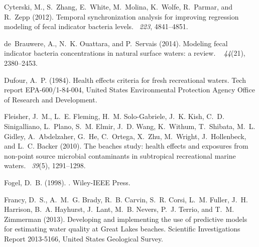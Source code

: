 \documentclass[authoryear,review, 12pt]{elsarticle}
\begin{document}
\begin{thebibliography}{}
Cyterski, M., S.~Zhang, E.~White, M.~Molina, K.~Wolfe, R.~Parmar, and R.~Zepp
  (2012).
\newblock Temporal synchronization analysis for improving regression modeling
  of fecal indicator bacteria levels.
~{\em 223}, 4841--4851.

de~Brauwere, A., N.~K. Ouattara, and P.~Servais (2014).
\newblock Modeling fecal indicator bacteria concentrations in natural surface
  waters: a review.
~{\em
  44\/}(21), 2380--2453.

Dufour, A.~P. (1984).
\newblock Health effects criteria for fresh recreational waters.
\newblock Tech report EPA-600/1-84-004, {United States Environmental Protection
  Agency Office of Research and Development}.

Fleisher, J.~M., L.~E. Fleming, H.~M. Solo-Gabriele, J.~K. Kish, C.~D.
  Sinigalliano, L.~Plano, S.~M. Elmir, J.~D. Wang, K.~Withum, T.~Shibata, M.~L.
  Gidley, A.~Abdelzaher, G.~He, C.~Ortega, X.~Zhu, M.~Wright, J.~Hollenbeck,
  and L.~C. Backer (2010).
\newblock The beaches study: health effects and exposures from non-point source
  microbial contaminants in subtropical recreational marine waters.
~{\em 39\/}(5),
  1291--1298.

Fogel, D.~B. (1998).
.
\newblock Wiley-IEEE Press.

Francy, D.~S., A.~M.~G. Brady, R.~B. Carvin, S.~R. Corsi, L.~M. Fuller, J.~H.
  Harrison, B.~A. Hayhurst, J.~Lant, M.~B. Nevers, P.~J. Terrio, and T.~M.
  Zimmerman (2013).
\newblock Developing and implementing the use of predictive models for
  estimating water quality at {G}reat {L}akes beaches.
\newblock Scientific Investigations Report 2013-5166, United States Geological
  Survey.


\end{thebibliography}
\end{document}
